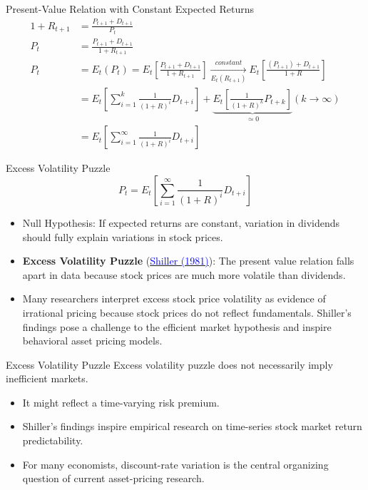 \documentclass{beamer}
\begin{document}
\begin{frame}{Present-Value Relation with Constant Expected Returns}
\begin{equation*}
    \begin{aligned}
		1+R_{t+1}&=\frac{P_{t+1}+D_{t+1}}{P_{t}} \\
		P_{t}&=\frac{P_{t+1}+D_{t+1}}{1+R_{t+1}} \\
		P_{t}&=E_{t}\left(P_{t}\right)=E_{t}\left[\frac{P_{t+1}+D_{t+1}}{1+R_{t+1}}\right]\xrightarrow[E_t(R_{t+1})]{constant}E_{t}\left[\frac{\left(P_{t+1}\right)+D_{t+1}}{1+R}\right] \\
		&=E_{t}\left[\sum_{i=1}^{k} \frac{1}{(1+R)^{i}} D_{t+i}\right]+\underbrace{E_{t}[\frac{1}{(1+R)^{k}} P_{t+k}]}_{\simeq 0} (k\longrightarrow \infty) \\
		& = E_{t}\left[\sum_{i=1}^{\infty} \frac{1}{(1+R)^{i}} D_{t+i}\right]
    \end{aligned}
\end{equation*}
\end{frame}

\begin{frame}{Excess Volatility Puzzle}
	\begin{equation*}
		P_{t} = E_{t}\left[\sum_{i=1}^{\infty} \frac{1}{(1+R)^{i}} D_{t+i}\right]
	\end{equation*}
\begin{itemize}
	\item Null Hypothesis: If expected returns are constant, variation in dividends
	should fully explain variations in stock prices.
	\item \textbf{Excess Volatility Puzzle} (\href{http://www.jstor.org/stable/1802789}{\textcolor{blue}{Shiller (1981)}}): The present value relation falls apart
	in data because stock prices are much more volatile than dividends.
	\item Many researchers interpret excess stock price volatility as evidence of
	irrational pricing because stock prices do not reflect fundamentals.
	Shiller's findings pose a challenge to the efficient market hypothesis and
	inspire behavioral asset pricing models.
\end{itemize}
\end{frame}

\begin{frame}{Excess Volatility Puzzle}
	Excess volatility puzzle does not necessarily imply inefficient markets.
	\begin{itemize}
		\item It might reflect a time-varying risk premium.
		\item Shiller's findings inspire empirical research on time-series stock market
		return predictability.
		\item For many economists, discount-rate variation is the central organizing
		question of current asset-pricing research.
	\end{itemize}
\end{frame}
\end{document}

